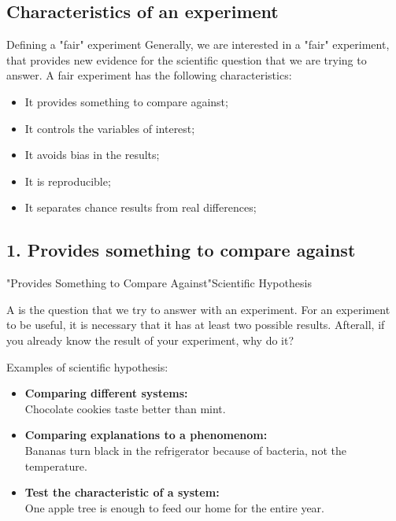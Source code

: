 \subsection{Characteristics of an experiment}
\begin{frame}{Defining a "fair" experiment}
  Generally, we are interested in a "fair" experiment, that provides new evidence
  for the scientific question that we are trying to answer. A fair experiment has the following characteristics:\vfill

  \begin{itemize}
    \item It provides something to compare against;\medskip
    \item It controls the variables of interest;\medskip
    \item It avoids bias in the results;\medskip
    \item It is reproducible;\medskip
    \item It separates chance results from real differences;
  \end{itemize}
\end{frame}

\subsection{1. Provides something to compare against}
\begin{frame}{"Provides Something to Compare Against"}{Scientific Hypothesis}

  A  is the question that we try to answer with an experiment. For an experiment to be useful, it is necessary that it has at least two possible results. Afterall, if you already know the result of your experiment, why do it?
  \vfill

  Examples of scientific hypothesis:
  \begin{itemize}
    \item {\bf Comparing different systems:}\\
    Chocolate cookies taste better than mint.
    \item {\bf Comparing explanations to a phenomenom:}\\
    Bananas turn black in the refrigerator because of bacteria, not the temperature.
    \item {\bf Test the characteristic of a system:}\\
    One apple tree is enough to feed our home for the entire year.
  \end{itemize}\bigskip
\end{frame}

